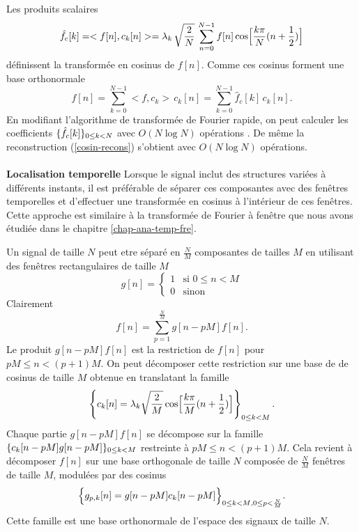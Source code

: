 Les produits scalaires
\begin{equation}
\label{DCT_I}
{\hat f_c [k]}  = <f[n], c_k[n] > = 
\lambda_k\, \sqrt {\frac 2 N}\,
\sum_{n=0} ^{N-1} f[n] \cos\Bigl[\frac {k \pi} N (n+{\frac 1 2})\Bigr]  
\end{equation}
d\'efinissent la transform\'ee en cosinus de 
$f[n]$. Comme ces cosinus forment une base orthonormale
\begin{equation}
\label{cosin-recons}
{f[n]}  = 
\sum_{k=0} ^{N-1} <f, c_k >\, c_k [n] =
\sum_{k=0} ^{N-1} \hat f_c [k] \,c_k [n] .
\end{equation}
En modifiant l'algorithme de transform\'ee de Fourier rapide,
on peut calculer les coefficients $\{\hat f_c [k]\}_{ 0 \leq k < N}$
avec $O(N \log N)$ op\'erations \cite{vetterli}. 
De m\^eme la reconstruction
(\ref{cosin-recons}) s'obtient avec
$O(N \log N)$ op\'erations.\\ 
\\
{\bf Localisation temporelle}
Lorsque le signal
inclut des structures vari\'ees \`a diff\'erents instants,
il est pr\'ef\'erable de s\'eparer ces composantes avec des fen\^etres
temporelles et d'effectuer une transform\'ee en cosinus \`a l'int\'erieur
de ces fen\^etres. Cette approche est similaire \`a 
la transform\'ee de Fourier \`a fen\^etre que nous avons \'etudi\'ee
dans le chapitre \ref{chap-ana-temp-fre}.


Un signal de taille $N$ peut etre s\'epar\'e en $\frac N M$ composantes
de tailles $M$ en utilisant 
des fen\^etres rectangulaires de taille $M$
\[
g[n] = \left\{
\begin{array}{ll}
1 & \mbox{si $0 \leq n < M $}\\
0 & \mbox{sinon}
\end{array}
\right.
\]
Clairement
\[
f[n] = \sum_{p=1}^{\frac N M} g[n-pM] f[n] .
\]
Le produit $g[n - pM] f[n]$ est la
restriction de $f[n]$ pour $p M \leq n < (p+1) M$.
On peut d\'ecomposer cette restriction sur une base de
de cosinus de taille $M$ obtenue en translatant la famille
\[
\left\{ c_k [n] = {\lambda_k} \sqrt {\frac 2 M} 
\cos\Bigl[\frac {k \pi} M (n+{\frac 1 2})\Bigr] \right\}_{ 0 \leq k < M} .
\]
Chaque partie 
$g[n - pM] f[n]$ se d\'ecompose sur la
famille $\{ c_k [n-pM] g[n-pM] \}_{ 0 \leq k < M}$ restreinte \`a 
$p M \leq n < (p+1) M$.
Cela revient \`a d\'ecomposer $f[n]$ sur une base orthogonale
de taille $N$ compos\'ee de $\frac N M$ fen\^etres de taille $M$,
modul\'ees par des cosinus 
\begin{equation}
\label{base-loc-cs}
\Bigl\{ g_{p,k} [n] =
g[n-pM] c_k [n-pM] \Bigr\}_{{ 0 \leq k < M}, 0 \leq p < \frac N M} .
\end{equation}
Cette famille est une base orthonormale
de l'espace des signaux de taille $N$.\\

